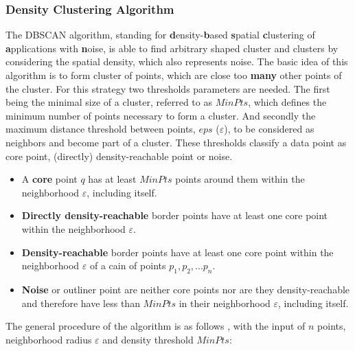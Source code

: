 \documentclass[a4paper,headsepline,footsepline,fontsize=11pt,BCOR=12mm,DIV=12]{report}
\begin{document}
\subsubsection{Density Clustering Algorithm}

The DBSCAN algorithm, standing for \textbf{d}ensity-\textbf{b}ased \textbf{s}patial \textbf{c}lustering of \textbf{a}pplications with \textbf{n}oise, is able to find arbitrary shaped cluster and clusters by considering the spatial density, which also represents noise. The basic idea of this algorithm is to form cluster of points, which are close too \textbf{many} other points of the cluster. For this strategy two thresholds parameters are needed. The first being the minimal size of a cluster, referred to as $MinPts$, which defines the minimum number of points necessary to form a cluster. And secondly the maximum distance threshold between points, $eps$ ($\varepsilon$), to be considered as neighbors and become part of a cluster. These thresholds classify a data point as core point, (directly) density-reachable point or noise. \cite{Yildirim2020,Chauhan2020,Padro2017}

\begin{itemize}
	\item A \textbf{core} point $q$ has at least $MinPts$ points around them within the neighborhood $\varepsilon$, including itself.
    \item \textbf{Directly density-reachable} border points have at least one core point within the neighborhood $\varepsilon$.
     \item \textbf{Density-reachable} border points have at least one core point within the neighborhood $\varepsilon$ of a cain of points $p_1,p_2,...p_n$.
 	\item \textbf{Noise} or outliner point are neither core points nor are they density-reachable and therefore have less than $MinPts$ in their neighborhood $\varepsilon$, including itself.
\end{itemize}

The general procedure of the algorithm is as follows \cite{Zhao2018}, with the input of $n$ points, neighborhood radius $\varepsilon$ and density threshold $MinPts$:
\end{document}
